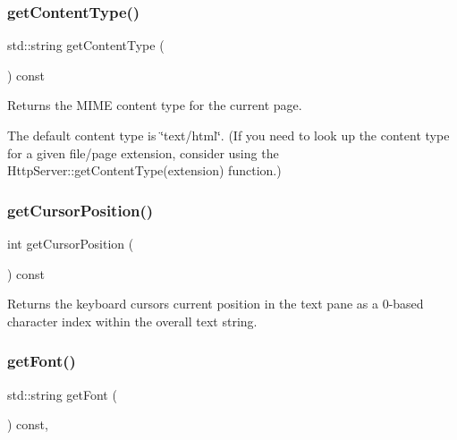 \subsubsection{\texorpdfstring{get\+Content\+Type()}{getContentType()}}
{\footnotesize\ttfamily std\+::string get\+Content\+Type (\begin{DoxyParamCaption}{ }\end{DoxyParamCaption}) const\hspace{0.3cm}{\ttfamily [virtual]}}



Returns the M\+I\+ME content type for the current page. 

The default content type is \char`\"{}text/html\char`\"{}. (If you need to look up the content type for a given file/page extension, consider using the Http\+Server\+::get\+Content\+Type(extension) function.) \mbox{\label{classGBrowserPane_aa85d2267b4534eb372cd3114ea61ba3b}} 
\subsubsection{\texorpdfstring{get\+Cursor\+Position()}{getCursorPosition()}}
{\footnotesize\ttfamily int get\+Cursor\+Position (\begin{DoxyParamCaption}{ }\end{DoxyParamCaption}) const\hspace{0.3cm}{\ttfamily [virtual]}}



Returns the keyboard cursor\textquotesingle{}s current position in the text pane as a 0-\/based character index within the overall text string. 

\mbox{\label{classGInteractor_a894a5502900794eeb27d084c21f1d77d}} 
\subsubsection{\texorpdfstring{get\+Font()}{getFont()}}
{\footnotesize\ttfamily std\+::string get\+Font (\begin{DoxyParamCaption}{ }\end{DoxyParamCaption}) const\hspace{0.3cm}{\ttfamily [virtual]}, {\ttfamily [inherited]}}



